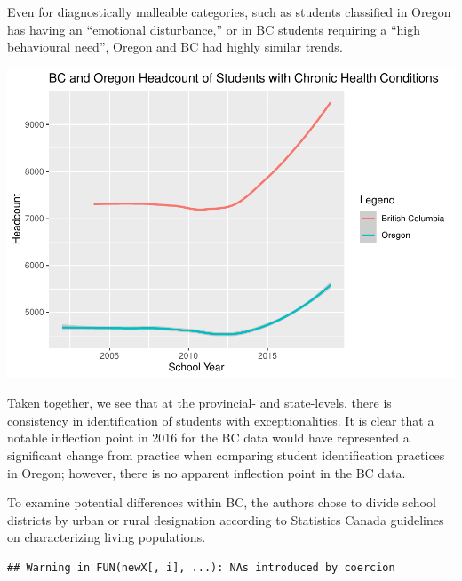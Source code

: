 \documentclass[
  english,
  man]{apa6}
\begin{document}
Even for diagnostically malleable categories, such as students classified in Oregon has having an \enquote{emotional disturbance,} or in BC students requiring a \enquote{high behavioural need}, Oregon and BC had highly similar trends.

\includegraphics{Final_project_files/figure-latex/BCOR combo-1.pdf}

Taken together, we see that at the provincial- and state-levels, there is consistency in identification of students with exceptionalities. It is clear that a notable inflection point in 2016 for the BC data would have represented a significant change from practice when comparing student identification practices in Oregon; however, there is no apparent inflection point in the BC data.

To examine potential differences within BC, the authors chose to divide school districts by urban or rural designation according to Statistics Canada guidelines on characterizing living populations.

\begin{verbatim}
## Warning in FUN(newX[, i], ...): NAs introduced by coercion
\end{verbatim}
\end{document}
